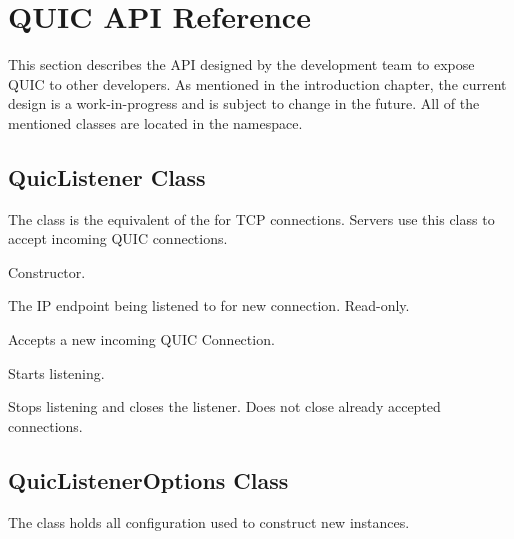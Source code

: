 \section{QUIC API Reference}\label{sec:06-api}

This section describes the API designed by the \dotnet{} development team to expose QUIC to other
developers. As mentioned in the introduction chapter, the current design is a work-in-progress and
is subject to change in the future. All of the mentioned classes are located in the
 namespace.

\subsection{QuicListener Class}

The  class is the equivalent of the  for TCP connections.
Servers use this class to accept incoming QUIC connections.

\begin{description}

     Constructor.

     The IP endpoint being listened to for new
connection. Read-only.

Accepts a new incoming QUIC Connection.

     Starts listening.

     Stops listening and closes the listener. Does not close
already accepted connections.

\end{description}

\subsection{QuicListenerOptions Class}

The  class holds all configuration used to construct new
 instances.

